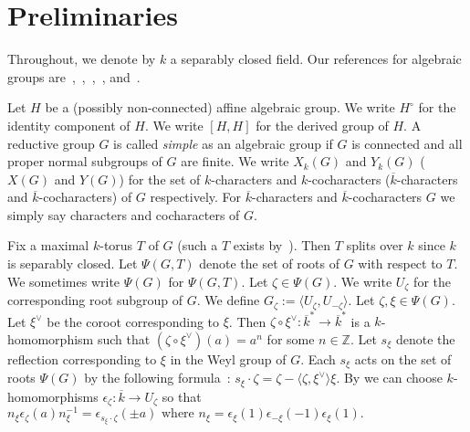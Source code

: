 \section{Preliminaries}
Throughout, we denote by $k$ a separably closed field. Our references for algebraic groups are~\cite{Borel-AG-book},~\cite{Borel-Tits-Groupes-reductifs},~\cite{Conrad-pred-book},~\cite{Humphreys-book1}, and~\cite{Springer-book}. 

Let $H$ be a (possibly non-connected) affine algebraic group. We write $H^{\circ}$ for the identity component of $H$. We write $[H,H]$ for the derived group of $H$. A reductive group $G$ is called \emph{simple} as an algebraic group if $G$ is connected and all proper normal subgroups of $G$ are finite. We write $X_k(G)$ and $Y_k(G)$ ($X(G)$ and $Y(G)$) for the set of $k$-characters and $k$-cocharacters ($\overline k$-characters and $\overline k$-cocharacters) of $G$ respectively. For $\overline k$-characters and $\overline k$-cocharacters $G$ we simply say characters and cocharacters of $G$. 

Fix a maximal $k$-torus $T$ of $G$ (such a $T$ exists by~\cite[Cor.~18.8]{Borel-AG-book}). Then $T$ splits over $k$ since $k$ is separably closed. Let $\Psi(G,T)$ denote the set of roots of $G$ with respect to $T$. We sometimes write $\Psi(G)$ for $\Psi(G,T)$. Let $\zeta\in\Psi(G)$. We write $U_\zeta$ for the corresponding root subgroup of $G$. We define $G_\zeta := \langle U_\zeta, U_{-\zeta} \rangle$. Let $\zeta, \xi \in \Psi(G)$. Let $\xi^{\vee}$ be the coroot corresponding to $\xi$. Then $\zeta\circ\xi^{\vee}:\overline k^{*}\rightarrow \overline k^{*}$ is a $k$-homomorphism such that $(\zeta\circ\xi^{\vee})(a) = a^n$ for some $n\in\mathbb{Z}$.
Let $s_\xi$ denote the reflection corresponding to $\xi$ in the Weyl group of $G$. Each $s_\xi$ acts on the set of roots $\Psi(G)$ by the following formula~\cite[Lem.~7.1.8]{Springer-book}:
$
s_\xi\cdot\zeta = \zeta - \langle \zeta, \xi^{\vee} \rangle \xi. 
$
\noindent By \cite[Prop.~6.4.2, Lem.~7.2.1]{Carter-simple-book} we can choose $k$-homomorphisms $\epsilon_\zeta : \overline k \rightarrow U_\zeta$  so that 
$
n_\xi \epsilon_\zeta(a) n_\xi^{-1}= \epsilon_{s_\xi\cdot\zeta}(\pm a)
            \text{ where } n_\xi = \epsilon_\xi(1)\epsilon_{-\xi}(-1)\epsilon_{\xi}(1).  \label{n-action on group}
$




